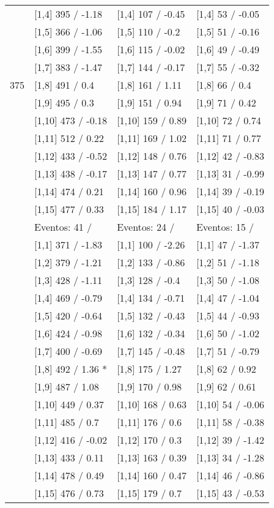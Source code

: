 \begin{table}
\begin{tabular}[t]{llll}
\addlinespace
 & {}[1,4] 395  / -1.18 & {}[1,4] 107  / -0.45 & {}[1,4] 53  / -0.05\\
 & {}[1,5] 366  / -1.06 & {}[1,5] 110  / -0.2 & {}[1,5] 51  / -0.16\\
 & {}[1,6] 399  / -1.55 & {}[1,6] 115  / -0.02 & {}[1,6] 49  / -0.49\\
 & {}[1,7] 383  / -1.47 & {}[1,7] 144  / -0.17 & {}[1,7] 55  / -0.32\\
375 & {}[1,8] 491  / 0.4 & {}[1,8] 161  / 1.11 & {}[1,8] 66  / 0.4\\
\addlinespace
 & {}[1,9] 495  / 0.3 & {}[1,9] 151  / 0.94 & {}[1,9] 71  / 0.42\\
 & {}[1,10] 473  / -0.18 & {}[1,10] 159  / 0.89 & {}[1,10] 72  / 0.74\\
 & {}[1,11] 512  / 0.22 & {}[1,11] 169  / 1.02 & {}[1,11] 71  / 0.77\\
 & {}[1,12] 433  / -0.52 & {}[1,12] 148  / 0.76 & {}[1,12] 42  / -0.83\\
 & {}[1,13] 438  / -0.17 & {}[1,13] 147  / 0.77 & {}[1,13] 31  / -0.99\\
\addlinespace
 & {}[1,14] 474  / 0.21 & {}[1,14] 160  / 0.96 & {}[1,14] 39  / -0.19\\
 & {}[1,15] 477  / 0.33 & {}[1,15] 184  / 1.17 & {}[1,15] 40  / -0.03\\
 & Eventos:  41 / & Eventos:  24 / & Eventos:  15 /\\
 & {}[1,1] 371  / -1.83 & {}[1,1] 100  / -2.26 & {}[1,1] 47  / -1.37\\
 & {}[1,2] 379  / -1.21 & {}[1,2] 133  / -0.86 & {}[1,2] 51  / -1.18\\
\addlinespace
 & {}[1,3] 428  / -1.11 & {}[1,3] 128  / -0.4 & {}[1,3] 50  / -1.08\\
 & {}[1,4] 469  / -0.79 & {}[1,4] 134  / -0.71 & {}[1,4] 47  / -1.04\\
 & {}[1,5] 420  / -0.64 & {}[1,5] 132  / -0.43 & {}[1,5] 44  / -0.93\\
 & {}[1,6] 424  / -0.98 & {}[1,6] 132  / -0.34 & {}[1,6] 50  / -1.02\\
 & {}[1,7] 400  / -0.69 & {}[1,7] 145  / -0.48 & {}[1,7] 51  / -0.79\\
\addlinespace
500 & {}[1,8] 492  / 1.36 * & {}[1,8] 175  / 1.27 & {}[1,8] 62  / 0.92\\
 & {}[1,9] 487  / 1.08 & {}[1,9] 170  / 0.98 & {}[1,9] 62  / 0.61\\
 & {}[1,10] 449  / 0.37 & {}[1,10] 168  / 0.63 & {}[1,10] 54  / -0.06\\
 & {}[1,11] 485  / 0.7 & {}[1,11] 176  / 0.6 & {}[1,11] 58  / -0.38\\
 & {}[1,12] 416  / -0.02 & {}[1,12] 170  / 0.3 & {}[1,12] 39  / -1.42\\
\addlinespace
 & {}[1,13] 433  / 0.11 & {}[1,13] 163  / 0.39 & {}[1,13] 34  / -1.28\\
 & {}[1,14] 478  / 0.49 & {}[1,14] 160  / 0.47 & {}[1,14] 46  / -0.86\\
 & {}[1,15] 476  / 0.73 & {}[1,15] 179  / 0.7 & {}[1,15] 43  / -0.53\\
\bottomrule
\end{tabular}
\end{table}
